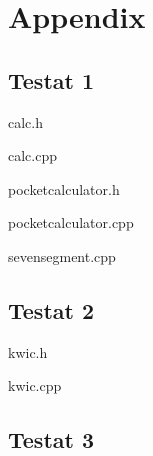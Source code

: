 \section{Appendix}

\subsection{Testat 1}
calc.h


calc.cpp


pocketcalculator.h


pocketcalculator.cpp


sevensegment.cpp


\subsection{Testat 2}
kwic.h


kwic.cpp


\subsection{Testat 3}
